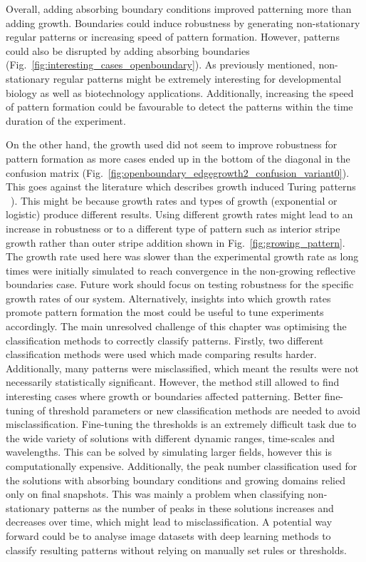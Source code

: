 Overall, adding absorbing boundary conditions improved patterning more than adding growth.
Boundaries could induce robustness by generating non-stationary regular patterns or increasing speed of pattern formation.
However, patterns could also be disrupted by adding absorbing boundaries (Fig.~\ref{fig:interesting_cases_openboundary}).
As previously mentioned, non-stationary regular patterns might be extremely interesting for developmental biology as well as biotechnology applications.
Additionally, increasing the speed of pattern formation could be favourable to detect the patterns within the time duration of the experiment.

On the other hand, the growth used did not seem to improve robustness for pattern formation as more cases ended up in the bottom of the diagonal in the confusion matrix (Fig.~\ref{fig:openboundary_edgegrowth2_confusion_variant0}).
This goes against the literature which describes growth induced Turing patterns ~\parencite{gaffney2010}).
This might be because growth rates and types of growth (exponential or logistic) produce different results.
Using different growth rates might lead to an increase in robustness or to a different type of pattern such as interior stripe growth rather than outer stripe addition shown in Fig.~\ref{fig:growing_pattern}.
The growth rate used here was slower than the experimental growth rate as long times were initially simulated to reach convergence in the non-growing reflective boundaries case.
Future work should focus on testing robustness for the specific growth rates of our system.
Alternatively, insights into which growth rates promote pattern formation the most could be useful to tune experiments accordingly.
The main unresolved challenge of this chapter was optimising the classification methods to correctly classify patterns.
Firstly, two different classification methods were used which made comparing results harder.
Additionally, many patterns were misclassified, which meant the results were not necessarily statistically significant.
However, the method still allowed to find interesting cases where growth or boundaries affected patterning.
Better fine-tuning of threshold parameters or new classification methods are needed to avoid misclassification.
Fine-tuning the thresholds is an extremely difficult task due to the wide variety of solutions with different dynamic ranges, time-scales and wavelengths.
This can be solved by simulating larger fields, however this is computationally expensive.
Additionally, the peak number classification used for the solutions with absorbing boundary conditions and growing domains relied only on final snapshots.
This was mainly a problem when classifying non-stationary patterns as the number of peaks in these solutions increases and decreases over time, which might lead to misclassification.
A potential way forward could be to analyse image datasets with deep learning methods to classify resulting patterns without relying on manually set rules or thresholds.